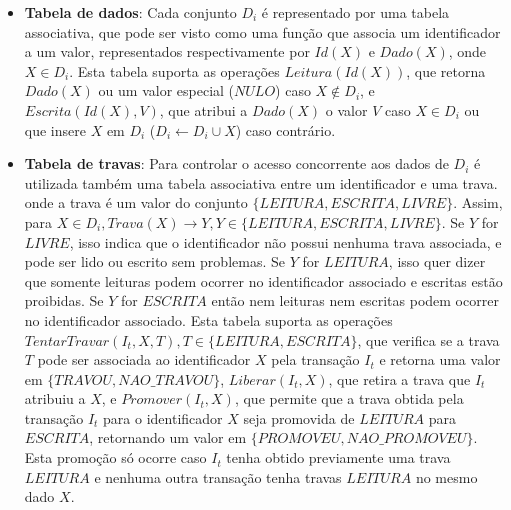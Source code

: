 \documentclass[11pt,twoside,a4paper]{book}
\begin{document}
\begin{itemize}

\item \textbf{Tabela de dados}: Cada conjunto \(D_i\) é representado por uma tabela associativa, que pode ser visto como uma função que associa um identificador a um valor, representados respectivamente por \(Id(X)\) e \(Dado(X)\), onde \(X \in D_i\). Esta tabela suporta as operações \(Leitura(Id(X))\), que retorna \(Dado(X)\) ou um valor especial (\(NULO\)) caso \(X \notin D_i\), e \(Escrita(Id(X), V)\), que atribui a \(Dado(X)\) o valor \(V\) caso $X \in D_i$ ou  que insere $X$ em $D_i$ ($D_i \gets D_i \cup X$) caso contrário. 

\item \textbf{Tabela de travas}: Para controlar o acesso concorrente aos dados de \(D_i\) é utilizada também uma tabela associativa entre um identificador e uma trava. onde a trava é um valor do conjunto \(\{LEITURA, ESCRITA, LIVRE\}\). Assim, para \(X \in D_i, Trava(X) \rightarrow Y, Y \in \{LEITURA, ESCRITA, LIVRE\}\). Se \(Y\) for \(LIVRE\), isso indica que o identificador não possui nenhuma trava associada, e pode ser lido ou escrito sem problemas. Se \(Y\) for \(LEITURA\), isso quer dizer que somente leituras podem ocorrer no identificador associado e escritas estão proibidas. Se \(Y\) for \(ESCRITA\) então nem leituras nem escritas podem ocorrer no identificador associado. Esta tabela suporta as operações \(TentarTravar(I_t, X, T), T \in \{LEITURA, ESCRITA\}\), que verifica se a trava \(T\) pode ser associada ao identificador \(X\) pela transação \(I_t\) e retorna uma valor em $\{TRAVOU, NAO\_TRAVOU\}$, \(Liberar(I_t, X)\), que retira a trava que \(I_t\) atribuiu a \(X\), e $Promover(I_t, X)$, que permite que a trava obtida pela transação $I_t$ para o identificador $X$ seja promovida de $LEITURA$ para $ESCRITA$, retornando um valor em $\{PROMOVEU, NAO\_PROMOVEU\}$. Esta promoção só ocorre caso $I_t$ tenha obtido previamente uma trava $LEITURA$ e nenhuma outra transação tenha travas $LEITURA$ no mesmo dado $X$.



\end{itemize}
\end{document}
